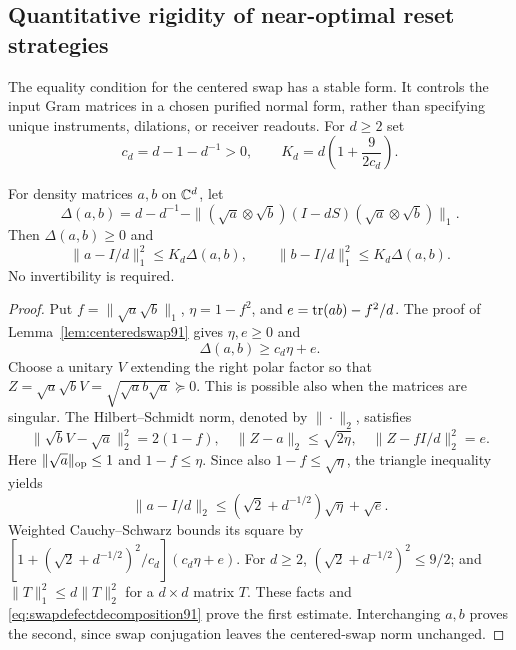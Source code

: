 \subsection{Quantitative rigidity of near-optimal reset strategies}
The equality condition for the centered swap has a stable form.  It
controls the input Gram matrices in a chosen purified normal form,
rather than specifying unique instruments, dilations, or receiver
readouts.  For $d\ge2$ set
\[
 c_d=d-1-d^{-1}>0,\qquad
 K_d=d\left(1+\frac{9}{2c_d}\right).
\]
\begin{lemma}\label{lem:stableswap91}
For density matrices $a,b$ on $\mathbb C^d$, let
\[
 \Delta(a,b)=d-d^{-1}
  -\| (\sqrt a\otimes\sqrt b)(I-dS)
                         (\sqrt a\otimes\sqrt b)\|_1.
\]
Then $\Delta(a,b)\ge0$ and
\begin{equation}\label{eq:stableswap91}
 \|a-I/d\|_1^2\le K_d\Delta(a,b),\qquad
 \|b-I/d\|_1^2\le K_d\Delta(a,b).
\end{equation}
No invertibility is required.
\end{lemma}
\begin{proof}
Put $f=\|\sqrt a\sqrt b\|_1$, $\eta=1-f^2$, and
$e=\operatorname{tr}(ab)-f^2/d$.  The proof of Lemma~\ref{lem:centeredswap91}
gives $\eta,e\ge0$ and
\begin{equation}\label{eq:swapdefectdecomposition91}
 \Delta(a,b)\ge c_d\eta+e.
\end{equation}
Choose a unitary $V$ extending the right polar factor so that
$Z=\sqrt a\sqrt b V=\sqrt{\sqrt a b\sqrt a}\succeq0$.
This is possible also when the matrices are singular.  The
Hilbert--Schmidt norm, denoted by $\|\cdot\|_2$, satisfies
\[
 \|\sqrt b V-\sqrt a\|_2^2=2(1-f),\quad
 \|Z-a\|_2\le\sqrt{2\eta},\quad
 \|Z-fI/d\|_2^2=e.
\]
Here $\|\sqrt a\|_{\rm op}\le1$ and $1-f\le\eta$.
Since also $1-f\le\sqrt\eta$, the triangle inequality yields
\[
 \|a-I/d\|_2\le(\sqrt2+d^{-1/2})\sqrt\eta+\sqrt e.
\]
Weighted Cauchy--Schwarz bounds its square by
$[1+(\sqrt2+d^{-1/2})^2/c_d](c_d\eta+e)$.
For $d\ge2$, $(\sqrt2+d^{-1/2})^2\le9/2$; and
$\|T\|_1^2\le d\|T\|_2^2$ for a $d\times d$ matrix $T$.
These facts and \eqref{eq:swapdefectdecomposition91} prove the first
estimate.  Interchanging $a,b$ proves the second, since swap
conjugation leaves the centered-swap norm unchanged.
\end{proof}

